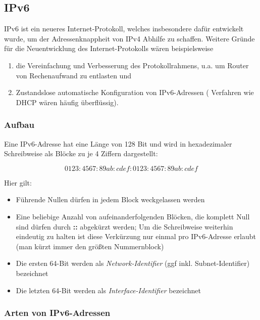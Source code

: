 \documentclass[a4paper, 12pt]{report}
\begin{document}
\subsection{IPv6}

IPv6 ist ein neueres Internet-Protokoll, welches insbesondere dafür entwickelt 
wurde, um der Adressenknappheit von IPv4 Abhilfe zu schaffen. Weitere Gründe 
für die Neuentwicklung des Internet-Protokolls wären beispielsweise 

\begin{enumerate}
	\item die Vereinfachung und Verbesserung des Protokollrahmens, u.a. um
		Router von Rechenaufwand zu entlasten und 
	\item Zustandslose automatische Konfiguration von IPv6-Adressen (
		Verfahren wie DHCP wären häufig überflüssig). 
\end{enumerate}

\subsubsection{Aufbau}

Eine IPv6-Adresse hat eine Länge von 128 Bit und wird in hexadezimaler 
Schreibweise als Blöcke zu je 4 Ziffern dargestellt:

\begin{equation}
	0123:4567:89ab:cdef:0123:4567:89ab:cdef
\end{equation}

Hier gilt: 
\begin{itemize}
	\item Führende Nullen dürfen in jedem Block weckgelassen werden
	\item Eine beliebige Anzahl von aufeinanderfolgenden Blöcken, die 
		komplett Null sind dürfen durch \textbf{::} abgekürzt werden; 
		Um die Schreibweise weiterhin eindeutig zu halten ist diese 
		Verkürzung nur einmal pro IPv6-Adresse erlaubt (man kürzt immer 
		den größten Nummernblock)
	\item Die ersten 64-Bit werden als \emph{Network-Identifier} (ggf inkl. 
		Subnet-Identifier) bezeichnet
	\item Die letzten 64-Bit werden als \emph{Interface-Identifier} 
		bezeichnet
\end{itemize}

\subsubsection{Arten von IPv6-Adressen}
\end{document}
